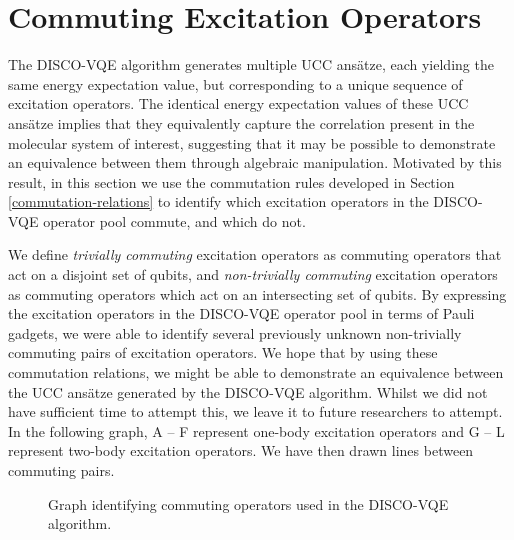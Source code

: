 \section{Commuting Excitation Operators}%
\label{operator-commutations}

The DISCO-VQE algorithm generates multiple UCC ansätze, each yielding the same energy expectation value, but corresponding to a unique sequence of excitation operators. The identical energy expectation values of these UCC ansätze implies that they equivalently capture the correlation present in the molecular system of interest, suggesting that it may be possible to demonstrate an equivalence between them through algebraic manipulation. Motivated by this result, in this section we use the commutation rules developed in Section \ref{commutation-relations} to identify which excitation operators in the DISCO-VQE operator pool commute, and which do not.

We define \textit{trivially commuting} excitation operators as commuting operators that act on a disjoint set of qubits, and \textit{non-trivially commuting} excitation operators as commuting operators which act on an intersecting set of qubits. By expressing the excitation operators in the DISCO-VQE operator pool in terms of Pauli gadgets, we were able to identify several previously unknown non-trivially commuting pairs of excitation operators. We hope that by using these commutation relations, we might be able to demonstrate an equivalence between the UCC ansätze generated by the DISCO-VQE algorithm. Whilst we did not have sufficient time to attempt this, we leave it to future researchers to attempt. In the following graph, A -- F represent one-body excitation operators and G -- L represent two-body excitation operators. We have then drawn lines between commuting pairs.

\begin{figure}[H]
    \centering
    \caption{Graph identifying commuting operators used in the DISCO-VQE algorithm.}
\end{figure}

